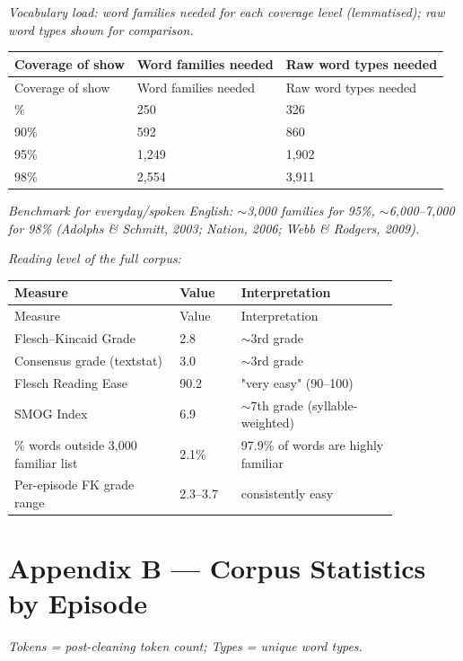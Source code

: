 \documentclass[11pt]{article}
\begin{document}
\emph{Vocabulary load: word families needed for each coverage level (lemmatised); raw word types shown for comparison.}

\small\setlength{\tabcolsep}{4pt}

\begin{longtable}{lll}
\toprule
Coverage of show & Word families needed & Raw word types needed \\
\midrule
\endfirsthead
\toprule
Coverage of show & Word families needed & Raw word types needed \\
\midrule
\endhead
\bottomrule
\endlastfoot
80\% & 250 & 326 \\
90\% & 592 & 860 \\
95\% & 1,249 & 1,902 \\
98\% & 2,554 & 3,911 \\
\end{longtable}
\normalsize\setlength{\tabcolsep}{6pt}

\emph{Benchmark for everyday/spoken English: $\sim$3,000 families for 95\%, $\sim$6,000--7,000 for 98\% (Adolphs \& Schmitt, 2003; Nation, 2006; Webb \& Rodgers, 2009).}

\emph{Reading level of the full corpus:}

\begin{longtable}{p{0.431\linewidth}lp{0.419\linewidth}}
\toprule
Measure & Value & Interpretation \\
\midrule
\endfirsthead
\toprule
Measure & Value & Interpretation \\
\midrule
\endhead
\bottomrule
\endlastfoot
Flesch--Kincaid Grade & 2.8 & $\sim$3rd grade \\
Consensus grade (textstat) & 3.0 & $\sim$3rd grade \\
Flesch Reading Ease & 90.2 & "very easy" (90--100) \\
SMOG Index & 6.9 & $\sim$7th grade (syllable-weighted) \\
\% words outside 3,000 familiar list & 2.1\% & 97.9\% of words are highly familiar \\
Per-episode FK grade range & 2.3--3.7 & consistently easy \\
\end{longtable}

\section*{Appendix B --- Corpus Statistics by Episode}

\emph{Tokens = post-cleaning token count; Types = unique word types.}
\end{document}

